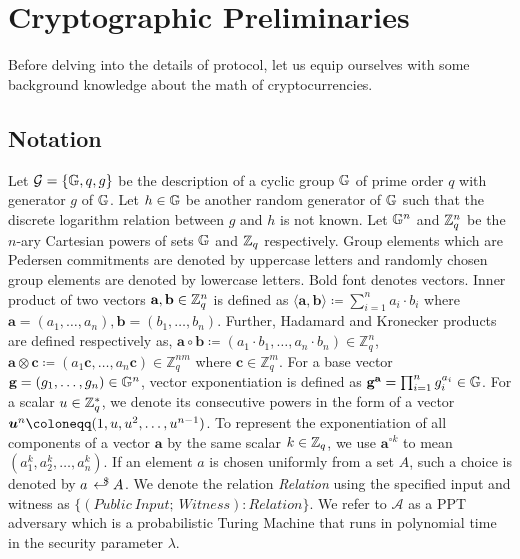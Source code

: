 \chapter{Cryptographic Preliminaries}

Before delving into the details of \RPlus protocol, let us equip ourselves with some background knowledge about the math of cryptocurrencies.


\section{Notation}
Let $\mathcal{G} = \{ \mathbb{G}, q, g \}$ be the description of a cyclic group $\mathbb{G}$ of prime order $q$ with generator $g$ of $\mathbb{G}$. Let $h\in \mathbb{G}$ be another random generator of $\mathbb{G}$ such that the discrete logarithm relation between $g$ and $h$ is not known. Let
$\mathbb{G}^n$ and $\mathbb{Z}^n_q$ be the $n$-ary Cartesian powers of sets $\mathbb{G}$ and $\mathbb{Z}_q$ respectively.
Group elements which are Pedersen commitments are denoted by uppercase letters and randomly chosen group elements are denoted by lowercase letters.
Bold font denotes vectors.
Inner product of two vectors $\textbf{a}, \textbf{b} \in \mathbb{Z}_q^n$ is defined as $\langle \textbf{a},\textbf{b} \rangle \coloneqq \sum_{i=1}^{n} a_i \cdot b_i$ where $\textbf{a}=(a_1,\dots, a_n), \textbf{b}=(b_1,\dots,b_n)$. Further, Hadamard and Kronecker products are defined respectively as, $\textbf{a} \circ \textbf{b} \coloneqq (a_1 \cdot b_1, \dots, a_n \cdot b_n) \in \mathbb{Z}_q^n$, $\textbf{a} \otimes \textbf{c} \coloneqq (a_1 \textbf{c}, \dots, a_n \textbf{c}) \in \mathbb{Z}_q^{nm}$ where $\textbf{c} \in \mathbb{Z}_q^m$. For a base vector $\textbf{g} = (g_1, \dots, g_n) \in \mathbb{G}^n$, vector exponentiation is defined as $\textbf{g}^{\textbf{a}} = \prod_{i=1}^{n}g_i^{a_i} \in \mathbb{G}$. For a scalar $u \in \mathbb{Z}_q^{\ast}$, we denote its consecutive powers in the form of a vector $\vecnb{u}^{n} \coloneqq (1, u, u^2, \dots, u^{n-1})$.
To represent the exponentiation of all components of a vector $\textbf{a}$ by the same scalar $k \in \mathbb{Z}_q$, we use $\textbf{a}^{\circ k}$ to mean $(a_1^k, a_2^k, \ldots,a_n^{k})$.
If an element $a$ is chosen uniformly from a set $A$, such a choice is denoted by $a \rgen A$.
We denote the relation \emph{Relation} using the specified input and witness as $\{ (Public \ Input; \ Witness): Relation \}$.
We refer to $\mathcal{A}$ as a \textsf{PPT} adversary which is a probabilistic Turing Machine that runs in polynomial time in the security parameter $\lambda$.
